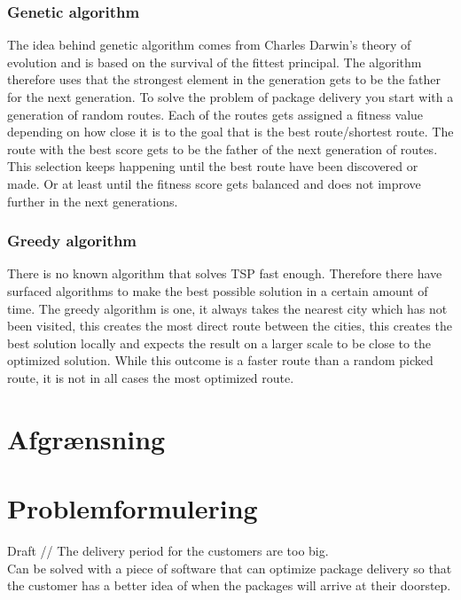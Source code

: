 \documentclass[12pt]{report}
\begin{document}
\subsection{Genetic algorithm}
The idea behind genetic algorithm comes from Charles Darwin's theory of evolution and is based on the survival of the fittest principal. The algorithm therefore uses that the strongest element in the generation gets to be the father for the next generation. To solve the problem of package delivery you start with a generation of random routes. Each of the routes gets assigned a fitness value depending on how close it is to the goal that is the best route/shortest route. The route with the best score gets to be the father of the next generation of routes. This selection keeps happening until the best route have been discovered or made. Or at least until the fitness score gets balanced and does not improve further in the next generations\cite{geneticalg}.

\subsection{Greedy algorithm}
There is no known algorithm that solves TSP fast enough. Therefore there have surfaced algorithms to make the best possible solution in a certain amount of time. The greedy algorithm is one, it always takes the nearest city which has not been visited, this creates the most direct route between the cities, this creates the best solution locally and expects the result on a larger scale to be close to the optimized solution. While this outcome is a faster route than a random picked route, it is not in all cases the most optimized route.\cite{solvingcdp} 

\chapter{Afgrænsning}

\chapter{Problemformulering}

Draft // The delivery period for the customers are too big. \\
Can be solved with a piece of software that can optimize package delivery so that the customer has a better idea of when the packages will arrive at their doorstep.




\end{document}
